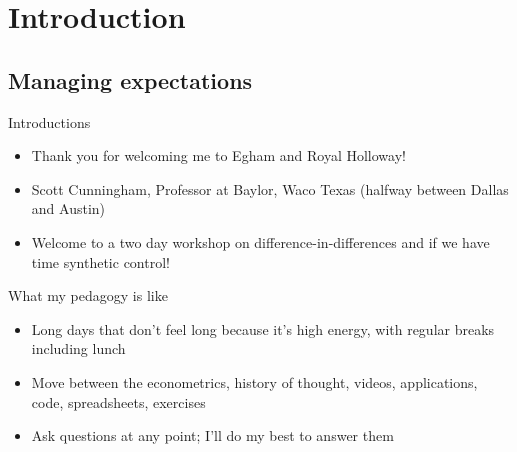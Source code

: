 \documentclass{beamer}
\begin{document}




\section{Introduction}

\subsection{Managing expectations}



\begin{frame}{Introductions}

\begin{itemize}
\item Thank you for welcoming me to Egham and Royal Holloway!
\item Scott Cunningham, Professor at Baylor, Waco Texas (halfway between Dallas and Austin) 
\item Welcome to a two day workshop on difference-in-differences and if we have time synthetic control!  
\end{itemize}

\end{frame}





\begin{frame}{What my pedagogy is like}

\begin{itemize}
\item Long days that don't feel long because it's high energy, with regular breaks including lunch
\item Move between the econometrics, history of thought, videos, applications, code, spreadsheets, exercises
\item Ask questions at any point; I'll do my best to answer them
\end{itemize}

\end{frame}
\end{document}

